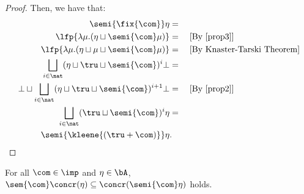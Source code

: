 \begin{proof}
  Then, we have that:
  \begin{align*}
    \semi{\fix{\com}} \eta & =\\
    \lfp{\lambda \mu. (\eta \sqcup \semi{\com} \mu)} &= \quad\text{[By \eqref{prop3}]}\\
    \lfp{\lambda \mu. (\eta \sqcup \mu \sqcup \semi{\com} \mu)} &= \quad\text{[By Knaster-Tarski Theorem]} \\
    \bigsqcup_{i \in \nat} (\eta \sqcup \tru \sqcup \semi{\com})^i \bot & = \\
    \bot \sqcup \bigsqcup_{i \in \nat} (\eta \sqcup \tru \sqcup \semi{\com})^{i+1} \bot & = \quad\text{[By \eqref{prop2}]}\\
    \bigsqcup_{i \in \nat} (\tru \sqcup \semi{\com})^{i} \eta & = \\
    \semi{\kleene{(\tru + \com)}} \eta &. \qedhere
  \end{align*}
  
\end{proof}


\begin{theorem}
  For all \(\com \in \imp\) and \(\eta\in \bA\),
  \(\sem{\com}\concr(\eta) \subseteq \concr(\semi{\com}\eta)\) holds.
\end{theorem}

